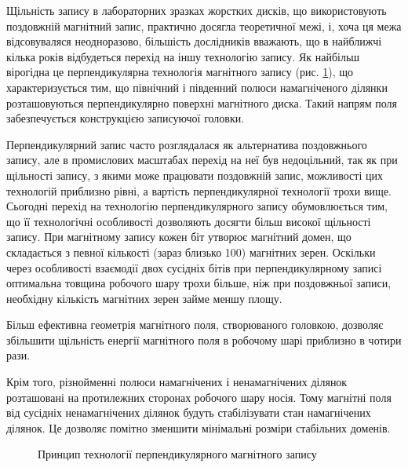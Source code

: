 \documentclass[a4paper,14pt]{extreport}
\begin{document}
\clearpage
\newpage


Щільність запису в лабораторних зразках жорстких дисків, що використовують поздовжній магнітний запис, практично досягла теоретичної межі, і, хоча ця межа відсовуваляся неодноразово, більшість дослідників вважають, що в найближчі кілька років відбудеться перехід на іншу технологію запису. Як найбільш вірогідна це перпендикулярна технологія магнітного запису\cite{lit5} (рис. \ref{ris11}), що характеризується тим, що північний і південний полюси намагніченого ділянки розташовуються перпендикулярно поверхні магнітного диска. Такий напрям поля забезпечується конструкцією записуючої головки.\par

Перпендикулярний запис часто розглядалася як альтернатива поздовжнього запису\cite{lit6}, але в промислових масштабах перехід на неї був недоцільний, так як при щільності запису, з якими може працювати поздовжній запис, можливості цих технологій приблизно рівні, а вартість перпендикулярної технології трохи вище. Сьогодні перехід на технологію перпендикулярного запису обумовлюється тим, що її технологічні особливості дозволяють досягти більш високої щільності запису. При магнітному запису кожен біт утворює магнітний домен, що складається з певної кількості (зараз близько 100) магнітних зерен. Оскільки через особливості взаємодії двох сусідніх бітів при перпендикулярному записі оптимальна товщина робочого шару трохи більше, ніж при поздовжньої записи, необхідну кількість магнітних зерен займе меншу площу.\par

Більш ефективна геометрія магнітного поля, створюваного головкою, дозволяє збільшити щільність енергії магнітного поля в робочому шарі приблизно в чотири рази.\par

Крім того, різнойменні полюси намагнічених і ненамагнічених ділянок розташовані на протилежних сторонах робочого шару носія. Тому магнітні поля від сусідніх ненамагнічених ділянок будуть стабілізувати стан намагнічених ділянок. Це дозволяє помітно зменшити мінімальні розміри стабільних доменів.\par

\begin{figure}[h]
  \caption{Принцип технології перпендикулярного магнітного запису}
  \label{ris11}
\end{figure}
\end{document}
